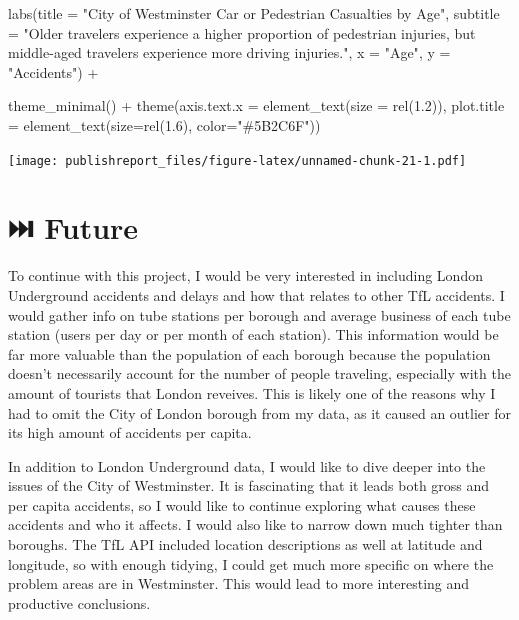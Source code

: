 \documentclass[
]{article}
\newenvironment{Shaded}{\begin{snugshade}}{\end{snugshade}}
\newcommand{\AttributeTok}[1]{\textcolor[rgb]{0.77,0.63,0.00}{#1}}
\newcommand{\FloatTok}[1]{\textcolor[rgb]{0.00,0.00,0.81}{#1}}
\newcommand{\FunctionTok}[1]{\textcolor[rgb]{0.00,0.00,0.00}{#1}}
\newcommand{\NormalTok}[1]{#1}
\newcommand{\SpecialCharTok}[1]{\textcolor[rgb]{0.00,0.00,0.00}{#1}}
\newcommand{\StringTok}[1]{\textcolor[rgb]{0.31,0.60,0.02}{#1}}
\begin{document}
\begin{Shaded}
\begin{Highlighting}[]
    \FunctionTok{labs}\NormalTok{(}\AttributeTok{title =} \StringTok{"City of Westminster Car or Pedestrian Casualties by Age"}\NormalTok{,}
         \AttributeTok{subtitle =} \StringTok{"Older travelers experience a higher proportion of pedestrian injuries, but middle{-}aged travelers experience more driving injuries."}\NormalTok{,}
         \AttributeTok{x =} \StringTok{"Age"}\NormalTok{,}
         \AttributeTok{y =} \StringTok{"Accidents"}\NormalTok{) }\SpecialCharTok{+}
    
    \FunctionTok{theme\_minimal}\NormalTok{() }\SpecialCharTok{+}
    \FunctionTok{theme}\NormalTok{(}\AttributeTok{axis.text.x =} \FunctionTok{element\_text}\NormalTok{(}\AttributeTok{size =} \FunctionTok{rel}\NormalTok{(}\FloatTok{1.2}\NormalTok{)),}
          \AttributeTok{plot.title =} \FunctionTok{element\_text}\NormalTok{(}\AttributeTok{size=}\FunctionTok{rel}\NormalTok{(}\FloatTok{1.6}\NormalTok{), }\AttributeTok{color=}\StringTok{"\#5B2C6F"}\NormalTok{))}
\end{Highlighting}
\end{Shaded}

\texttt{[image: publishreport\_files/figure-latex/unnamed-chunk-21-1.pdf]}

\hypertarget{future}{%
\section{⏭️ Future}\label{future}}

To continue with this project, I would be very interested in including
London Underground accidents and delays and how that relates to other
TfL accidents. I would gather info on tube stations per borough and
average business of each tube station (users per day or per month of
each station). This information would be far more valuable than the
population of each borough because the population doesn't necessarily
account for the number of people traveling, especially with the amount
of tourists that London reveives. This is likely one of the reasons why
I had to omit the City of London borough from my data, as it caused an
outlier for its high amount of accidents per capita.

In addition to London Underground data, I would like to dive deeper into
the issues of the City of Westminster. It is fascinating that it leads
both gross and per capita accidents, so I would like to continue
exploring what causes these accidents and who it affects. I would also
like to narrow down much tighter than boroughs. The TfL API included
location descriptions as well at latitude and longitude, so with enough
tidying, I could get much more specific on where the problem areas are
in Westminster. This would lead to more interesting and productive
conclusions.
\end{document}
